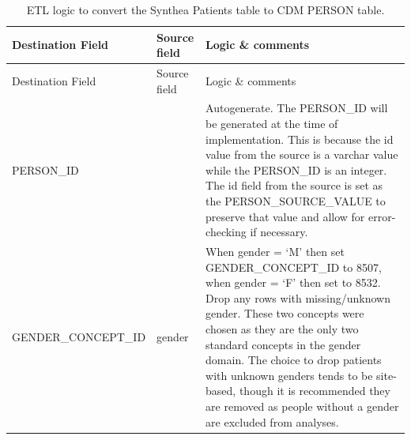 \documentclass[11pt]{book}
\theoremstyle{definition}
\theoremstyle{definition}
\theoremstyle{definition}
\theoremstyle{remark}
\begin{document}
\begin{longtable}[]{@{}lll@{}}
\caption{\label{tab:syntheaEtlPerson} ETL logic to convert the Synthea Patients table to CDM PERSON table.}\tabularnewline
\toprule
\begin{minipage}[b]{0.28\columnwidth}\raggedright
Destination Field\strut
\end{minipage} & \begin{minipage}[b]{0.12\columnwidth}\raggedright
Source field\strut
\end{minipage} & \begin{minipage}[b]{0.51\columnwidth}\raggedright
Logic \& comments\strut
\end{minipage}\tabularnewline
\midrule
\endfirsthead
\toprule
\begin{minipage}[b]{0.28\columnwidth}\raggedright
Destination Field\strut
\end{minipage} & \begin{minipage}[b]{0.12\columnwidth}\raggedright
Source field\strut
\end{minipage} & \begin{minipage}[b]{0.51\columnwidth}\raggedright
Logic \& comments\strut
\end{minipage}\tabularnewline
\midrule
\endhead
\begin{minipage}[t]{0.28\columnwidth}\raggedright
PERSON\_ID\strut
\end{minipage} & \begin{minipage}[t]{0.12\columnwidth}\raggedright
\strut
\end{minipage} & \begin{minipage}[t]{0.51\columnwidth}\raggedright
Autogenerate. The PERSON\_ID will be generated at the time of implementation. This is because the id value from the source is a varchar value while the PERSON\_ID is an integer. The id field from the source is set as the PERSON\_SOURCE\_VALUE to preserve that value and allow for error-checking if necessary.\strut
\end{minipage}\tabularnewline
\begin{minipage}[t]{0.28\columnwidth}\raggedright
GENDER\_CONCEPT\_ID\strut
\end{minipage} & \begin{minipage}[t]{0.12\columnwidth}\raggedright
gender\strut
\end{minipage} & \begin{minipage}[t]{0.51\columnwidth}\raggedright
When gender = `M' then set GENDER\_CONCEPT\_ID to 8507, when gender = `F' then set to 8532. Drop any rows with missing/unknown gender. These two concepts were chosen as they are the only two standard concepts in the gender domain. The choice to drop patients with unknown genders tends to be site-based, though it is recommended they are removed as people without a gender are excluded from analyses.\strut

\end{minipage}
\end{longtable}
\end{document}
